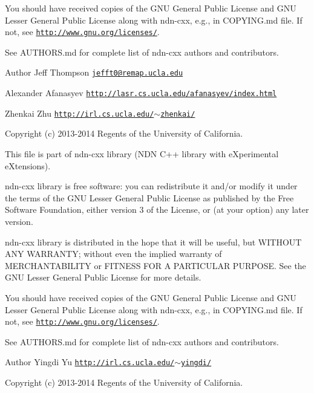 You should have received copies of the G\+NU General Public License and G\+NU Lesser General Public License along with ndn-\/cxx, e.\+g., in C\+O\+P\+Y\+I\+N\+G.\+md file. If not, see \href{http://www.gnu.org/licenses/}{\tt http\+://www.\+gnu.\+org/licenses/}.

See A\+U\+T\+H\+O\+R\+S.\+md for complete list of ndn-\/cxx authors and contributors.

\begin{DoxyAuthor}{Author}
Jeff Thompson \href{mailto:jefft0@remap.ucla.edu}{\tt jefft0@remap.\+ucla.\+edu} 

Alexander Afanasyev \href{http://lasr.cs.ucla.edu/afanasyev/index.html}{\tt http\+://lasr.\+cs.\+ucla.\+edu/afanasyev/index.\+html} 

Zhenkai Zhu \href{http://irl.cs.ucla.edu/~zhenkai/}{\tt http\+://irl.\+cs.\+ucla.\+edu/$\sim$zhenkai/}
\end{DoxyAuthor}
Copyright (c) 2013-\/2014 Regents of the University of California.

This file is part of ndn-\/cxx library (N\+DN C++ library with e\+Xperimental e\+Xtensions).

ndn-\/cxx library is free software\+: you can redistribute it and/or modify it under the terms of the G\+NU Lesser General Public License as published by the Free Software Foundation, either version 3 of the License, or (at your option) any later version.

ndn-\/cxx library is distributed in the hope that it will be useful, but W\+I\+T\+H\+O\+UT A\+NY W\+A\+R\+R\+A\+N\+TY; without even the implied warranty of M\+E\+R\+C\+H\+A\+N\+T\+A\+B\+I\+L\+I\+TY or F\+I\+T\+N\+E\+SS F\+OR A P\+A\+R\+T\+I\+C\+U\+L\+AR P\+U\+R\+P\+O\+SE. See the G\+NU Lesser General Public License for more details.

You should have received copies of the G\+NU General Public License and G\+NU Lesser General Public License along with ndn-\/cxx, e.\+g., in C\+O\+P\+Y\+I\+N\+G.\+md file. If not, see \href{http://www.gnu.org/licenses/}{\tt http\+://www.\+gnu.\+org/licenses/}.

See A\+U\+T\+H\+O\+R\+S.\+md for complete list of ndn-\/cxx authors and contributors.

\begin{DoxyAuthor}{Author}
Yingdi Yu \href{http://irl.cs.ucla.edu/~yingdi/}{\tt http\+://irl.\+cs.\+ucla.\+edu/$\sim$yingdi/}
\end{DoxyAuthor}
Copyright (c) 2013-\/2014 Regents of the University of California.

